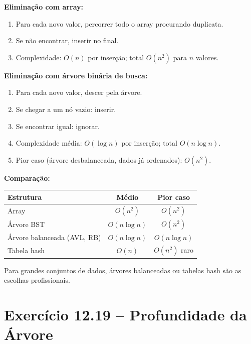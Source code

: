 \documentclass[12pt,a4paper]{article}
\begin{document}
\begin{respostabox}
\textbf{Eliminação com array:}
\begin{enumerate}[noitemsep]
  \item Para cada novo valor, percorrer todo o array procurando duplicata.
  \item Se não encontrar, inserir no final.
  \item Complexidade: $O(n)$ por inserção; total $O(n^2)$ para $n$ valores.
\end{enumerate}

\textbf{Eliminação com árvore binária de busca:}
\begin{enumerate}[noitemsep]
  \item Para cada novo valor, descer pela árvore.
  \item Se chegar a um nó vazio: inserir.
  \item Se encontrar igual: ignorar.
  \item Complexidade média: $O(\log n)$ por inserção; total $O(n \log n)$.
  \item Pior caso (árvore desbalanceada, dados já ordenados): $O(n^2)$.
\end{enumerate}

\textbf{Comparação:}
\begin{center}
\renewcommand{\arraystretch}{1.25}
\begin{tabular}{l c c}
\toprule
\textbf{Estrutura} & \textbf{Médio} & \textbf{Pior caso} \\ \midrule
Array            & $O(n^2)$        & $O(n^2)$ \\
Árvore BST       & $O(n \log n)$   & $O(n^2)$ \\
Árvore balanceada (AVL, RB) & $O(n \log n)$ & $O(n \log n)$ \\
Tabela hash      & $O(n)$          & $O(n^2)$ raro \\
\bottomrule
\end{tabular}
\end{center}

Para grandes conjuntos de dados, árvores balanceadas ou tabelas hash são as
escolhas profissionais.
\end{respostabox}

\newpage

\section{Exercício 12.19 -- Profundidade da Árvore}
\end{document}
